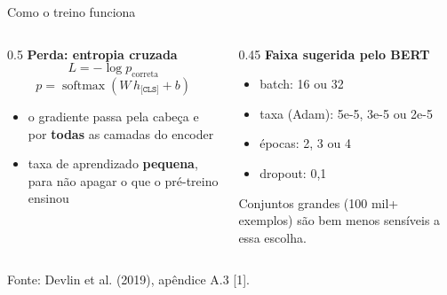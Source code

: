 \documentclass[aspectratio=169,10pt]{beamer}
\newcommand{\fonte}[1]{\par\vfill{\scriptsize\color{tinta2}Fonte: #1}}
\newcommand{\destaque}[1]{{\color{azul}\bfseries #1}}
\begin{document}
\begin{frame}{Como o treino funciona}
  \begin{columns}[T]
    \begin{column}{0.5\textwidth}
      \textbf{Perda: entropia cruzada}
      \[
        L = -\log p_{\text{correta}}
      \]
      \[
        p = \operatorname{softmax}(W\,h_{\texttt{[CLS]}} + b)
      \]
      \begin{itemize}
        \item o gradiente passa pela cabeça e por \destaque{todas} as camadas do encoder
        \item taxa de aprendizado \destaque{pequena}, para não apagar o que o pré-treino ensinou
      \end{itemize}
    \end{column}
    \begin{column}{0.45\textwidth}
      \textbf{Faixa sugerida pelo BERT}
      \begin{itemize}
        \item batch: 16 ou 32
        \item taxa (Adam): 5e-5, 3e-5 ou 2e-5
        \item épocas: 2, 3 ou 4
        \item dropout: 0,1
      \end{itemize}
      \vspace{0.5em}
      Conjuntos grandes (100 mil+ exemplos) são bem menos sensíveis a essa escolha.
    \end{column}
  \end{columns}
  \fonte{Devlin et al. (2019), apêndice A.3 [1].}
\end{frame}
\end{document}
